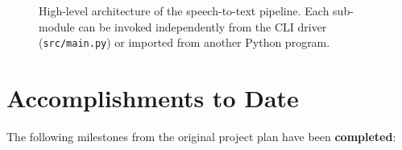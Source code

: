 \documentclass[twocolumn,10pt,a4paper]{article}
\begin{document}
\begin{figure}[!t]
  \centering
  \caption{High-level architecture of the speech-to-text pipeline.  Each
           sub-module can be invoked independently from the CLI driver
           (\texttt{src/main.py}) or imported from another Python program.}
  \label{fig:arch}
\end{figure}

\section{Accomplishments to Date}\label{sec:accomplishments}
The following milestones from the original project plan have been
\textbf{completed}:
\end{document}
